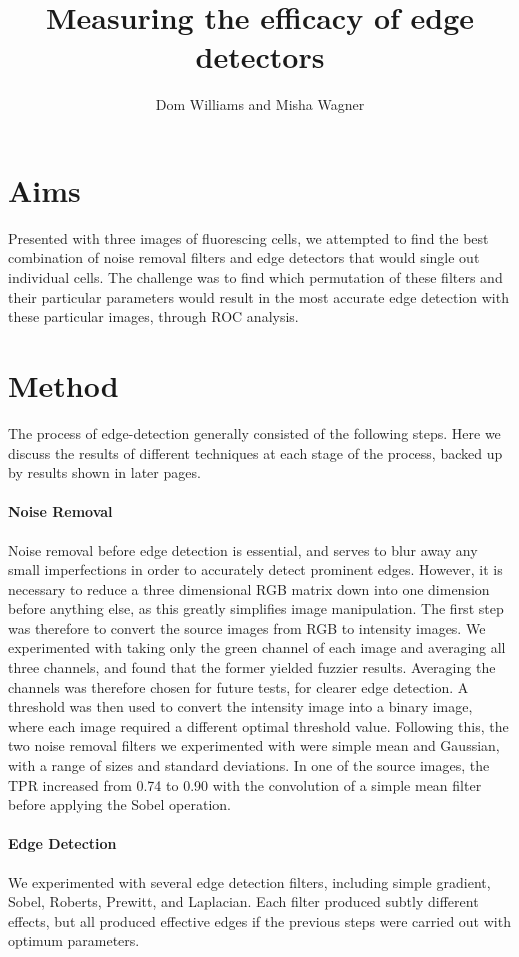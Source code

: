 \documentclass[10pt,a4paper]{article}
\author{Dom Williams and Misha Wagner}
\title{Measuring the efficacy of edge detectors}
\begin{document}
\section*{Aims}
Presented with three images of fluorescing cells, we attempted to find the best combination of noise removal filters and edge detectors that would single out individual cells. The challenge was to find which permutation of these filters and their particular parameters would result in the most accurate edge detection with these particular images, through ROC analysis.

\section*{Method}
The process of edge-detection generally consisted of the following steps. Here we discuss the results of different techniques at each stage of the process, backed up by results shown in later pages.

\paragraph{Noise Removal}
Noise removal before edge detection is essential, and serves to blur away any small imperfections in order to accurately detect prominent edges. However, it is necessary to reduce a three dimensional RGB matrix down into one dimension before anything else, as this greatly simplifies image manipulation. The first step was therefore to convert the source images from RGB to intensity images. We experimented with taking only the green channel of each image and averaging all three channels, and found that the former yielded fuzzier results. Averaging the channels was therefore chosen for future tests, for clearer edge detection. A threshold was then used to convert the intensity image into a binary image, where each image required a different optimal threshold value. Following this, the two noise removal filters we experimented with were simple mean and Gaussian, with a range of sizes and standard deviations. In one of the source images, the TPR increased from 0.74 to 0.90 with the convolution of a simple mean filter before applying the Sobel operation.

\paragraph{Edge Detection}
We experimented with several edge detection filters, including simple gradient, Sobel, Roberts, Prewitt, and Laplacian. Each filter produced subtly different effects, but all produced effective edges if the previous steps were carried out with optimum parameters.
\end{document}
